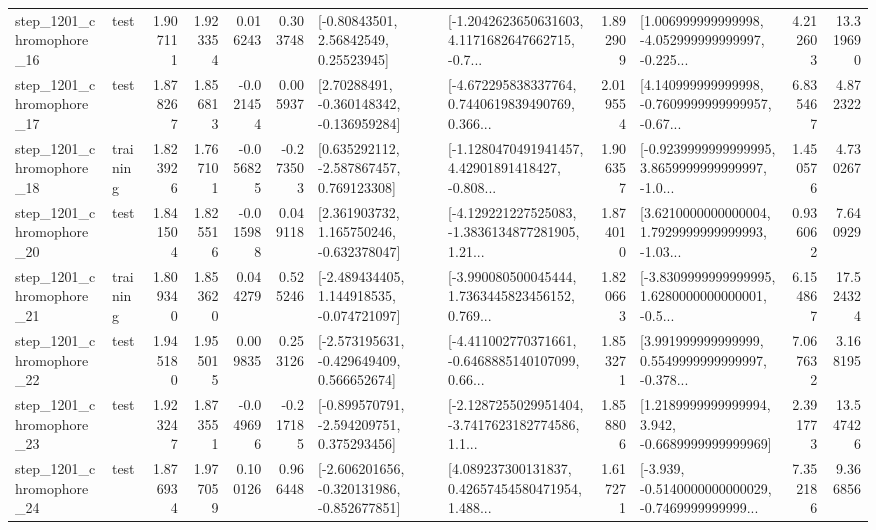 \begin{tabular}{llrrrrllrlrr}
 step\_1201\_chromophore\_16 &      test &      1.907111 &    1.923354 &      0.016243 &  0.303748 &       [-0.80843501, 2.56842549, 0.25523945] &  [-1.2042623650631603, 4.1171682647662715, -0.7... &       1.892909 &  [1.006999999999998, -4.052999999999997, -0.225... &            4.212603 &         13.319690 \\
 step\_1201\_chromophore\_17 &      test &      1.878267 &    1.856813 &     -0.021454 &  0.005937 &    [2.70288491, -0.360148342, -0.136959284] &  [-4.672295838337764, 0.7440619839490769, 0.366... &       2.019554 &  [4.140999999999998, -0.7609999999999957, -0.67... &            6.835467 &          4.872322 \\
 step\_1201\_chromophore\_18 &  training &      1.823926 &    1.767101 &     -0.056825 & -0.273503 &    [0.635292112, -2.587867457, 0.769123308] &  [-1.1280470491941457, 4.42901891418427, -0.808... &       1.906357 &  [-0.9239999999999995, 3.8659999999999997, -1.0... &            1.450576 &          4.730267 \\
 step\_1201\_chromophore\_20 &      test &      1.841504 &    1.825516 &     -0.015988 &  0.049118 &    [2.361903732, 1.165750246, -0.632378047] &  [-4.129221227525083, -1.3836134877281905, 1.21... &       1.874010 &  [3.6210000000000004, 1.7929999999999993, -1.03... &            0.936062 &          7.640929 \\
 step\_1201\_chromophore\_21 &  training &      1.809340 &    1.853620 &      0.044279 &  0.525246 &   [-2.489434405, 1.144918535, -0.074721097] &  [-3.990080500045444, 1.7363445823456152, 0.769... &       1.820663 &  [-3.8309999999999995, 1.6280000000000001, -0.5... &            6.154867 &         17.524324 \\
 step\_1201\_chromophore\_22 &      test &      1.945180 &    1.955015 &      0.009835 &  0.253126 &   [-2.573195631, -0.429649409, 0.566652674] &  [-4.411002770371661, -0.6468885140107099, 0.66... &       1.853271 &  [3.991999999999999, 0.5549999999999997, -0.378... &            7.067632 &          3.168195 \\
 step\_1201\_chromophore\_23 &      test &      1.923247 &    1.873551 &     -0.049696 & -0.217185 &   [-0.899570791, -2.594209751, 0.375293456] &  [-2.1287255029951404, -3.7417623182774586, 1.1... &       1.858806 &   [1.2189999999999994, 3.942, -0.6689999999999969] &            2.391773 &         13.547426 \\
 step\_1201\_chromophore\_24 &      test &      1.876934 &    1.977059 &      0.100126 &  0.966448 &  [-2.606201656, -0.320131986, -0.852677851] &  [4.089237300131837, 0.42657454580471954, 1.488... &       1.617271 &  [-3.939, -0.5140000000000029, -0.7469999999999... &            7.352186 &          9.366856 \\

\end{tabular}
